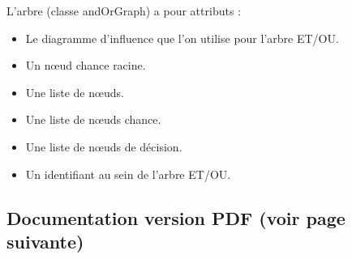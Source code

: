 \documentclass[12pt]{article}
\begin{document}
L'arbre (classe andOrGraph) a pour attributs :
\begin{itemize}
\item Le diagramme d'influence que l'on utilise pour l'arbre ET/OU.
\item Un nœud chance racine.
\item Une liste de nœuds.
\item Une liste de nœuds chance.
\item Une liste de nœuds de décision.
\item Un identifiant au sein de l'arbre ET/OU.
\end{itemize}
\subsection{Documentation version PDF (voir page suivante)}

\end{document}
